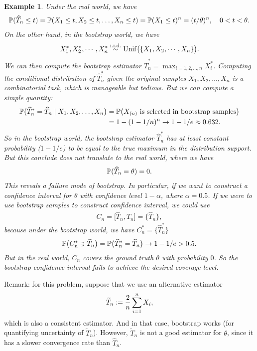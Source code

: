 \documentclass[11pt,letterpaper]{article}
\numberwithin{assumption}{lecture}
\newtheorem{example}{Example}
\numberwithin{theorem}{lecture}
\numberwithin{proposition}{lecture}
\numberwithin{lemma}{lecture}
\numberwithin{claim}{lecture}
\numberwithin{corollary}{lecture}
\numberwithin{definition}{lecture}
\numberwithin{conjecture}{lecture}
\numberwithin{remark}{lecture}
\numberwithin{example}{lecture}
\numberwithin{equation}{lecture}
\begin{document}
\begin{example}
  Under the real world, we have
  \begin{align*}
    {\mathbb{P}} (\widehat{T}_n \leq t) = {\mathbb{P}} (X_1 \leq t, X_2 \leq t, \ldots, X_n \leq t) = {\mathbb{P}} (X_1 \leq t)^n = (t / \theta)^n, \quad 0 < t < \theta.
  \end{align*}
  On the other hand, in the bootstrap world, we have
  \begin{align*}
    X_1^*, X_2^*, \cdots, X_n^* \overset{\mathrm{i.i.d.}}{\sim} \mathrm{Unif} \big(\{X_1, X_2, \cdots, X_n\} \big).
  \end{align*}
  We can then compute the bootstrap estimator $\widehat{T}_n^* = \max_{i=1, 2, \ldots, n} X_i^*$. Computing the conditional distribution of $\widehat{T}_n^*$ given the original samples $X_1, X_2, \ldots, X_n$ is a combinatorial task, which is manageable but tedious. But we can compute a simple quantity:
  \begin{align*}
    {\mathbb{P}} \big( \widehat{T}_n^* = \widehat{T}_n \mid X_1, X_2, \ldots, X_n \big) & = {\mathbb{P}} \big( X_{(n)} \mbox{ is selected in bootstrap samples} \big) \\
    &= 1 - (1 - 1/n)^n \to 1 - 1/e \approx 0.632.
  \end{align*}
  So in the bootstrap world, the bootstrap estimator $\widehat{T}_n^*$ has at least constant probability ($1 - 1/e$) to be equal to the true maximum in the distribution support. But this conclude does not translate to the real world, where we have
  \begin{align*}
    {\mathbb{P}} (\widehat{T}_n = \theta) = 0.
  \end{align*}
  This reveals a failure mode of bootstrap. In particular, if we want to construct a confidence interval for $\theta$ with confidence level $1 - \alpha$, where $\alpha = 0.5$. If we were to use bootstrap samples to construct confidence interval, we could use
  \begin{align*}
    C_n = \big[ \widehat{T}_n, \widehat{T}_n \big] = \{ \widehat{T}_n\},
  \end{align*}
  because under the bootstrap world, we have $C_n^* = \{ \widehat{T}_n^*\}$
  \begin{align*}
    {\mathbb{P}} \big( C_n^* \ni \widehat{T}_n \big) = {\mathbb{P}} \big( \widehat{T}_n^* = \widehat{T}_n \big) \to 1 - 1/e > 0.5.
  \end{align*}
  But in the real world, $C_n$ covers the ground truth $\theta$ with probability $0$. So the bootstrap confidence interval fails to achieve the desired coverage level.
\end{example}
Remark: for this problem, suppose that we use an alternative estimator
\begin{align*}
  \widetilde{T}_n := \frac{2}{n} \sum_{i=1}^n X_i,
\end{align*}
which is also a consistent estimator. And in that case, bootstrap works (for quantifying uncertainty of $\widetilde{T}_n$). However, $\widetilde{T}_n$ is not a good estimator for $\theta$, since it has a slower convergence rate than $\widehat{T}_n$.
\end{document}
